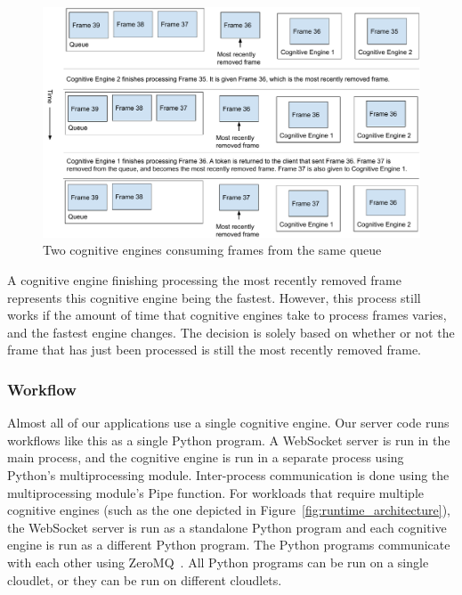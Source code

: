 \begin{figure}[h]
  \includegraphics[width=\textwidth]{figures/flow_control.pdf}
  \caption{
    Two cognitive engines consuming frames from the same queue
  }\label{fig:flow_control}
\end{figure}

A cognitive engine finishing processing the most recently removed frame
represents this cognitive engine being the fastest.
However, this process still works if the amount of time that cognitive engines
take to process frames varies, and the fastest engine changes.
The decision is solely based on whether or not the frame that has just been
processed is still the most recently removed frame.

\subsubsection{Workflow}

Almost all of our applications use a single cognitive engine. Our server code
runs workflows like this as a single Python program. A WebSocket server is run
in the main process, and the cognitive engine is run in a separate process using
Python's multiprocessing module. Inter-process communication is done using the
multiprocessing module's Pipe function. For workloads that require multiple
cognitive engines (such as the one depicted in
Figure~\ref{fig:runtime_architecture}),
the WebSocket server is run as a standalone Python program and each cognitive
engine is run as a different Python program.
The Python programs communicate with each other using ZeroMQ~\cite{zmq}.
All Python programs can be run on a single cloudlet, or they can be run on
different cloudlets.

